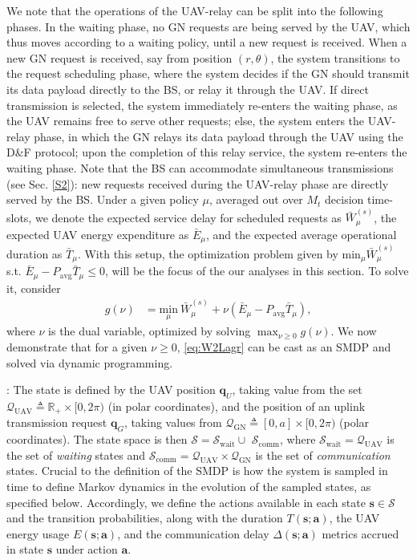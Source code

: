 \documentclass[12pt, draftcls, onecolumn]{IEEEtran}
\theoremstyle{plain}
\theoremstyle{definition}
\theoremstyle{remark}
\begin{document}
We note that the operations of the UAV-relay can be split into the following phases. In the waiting phase, no GN requests are being served by the UAV, which thus moves according to a waiting policy, until a new request is received. When a new GN request is received, say from position $(r,\theta)$, the system transitions to the request scheduling phase, where the system decides if the GN should transmit its data payload directly to the BS, or relay it through the UAV. If direct transmission is selected, the system immediately re-enters the waiting phase, as the UAV remains free to serve other requests; else, the system enters the UAV-relay phase, in which the GN relays its data payload through the UAV using the D\&F protocol; upon the completion of this relay service, the system re-enters the waiting phase. Note that the BS can accommodate simultaneous transmissions (see Sec. \ref{S2}): new requests received during the UAV-relay phase are directly served by the BS. Under a given policy $\mu$, averaged out over $M_{t}$ decision time-slots, we denote the expected service delay for scheduled requests as $\bar{W}_{\mu}^{(s)}$, the expected UAV energy expenditure as $\bar{E}_{\mu}$, and the expected average operational duration as $\bar{T}_{\mu}$. With this setup, the optimization problem given by ${\mathrm{min}}_{\mu}\bar{W}_{\mu}^{(s)}$ s.t. $\bar{E}_{\mu}{-}P_{\mathrm{avg}}\bar{T}_{\mu}{\leq}0$, will be the focus of the our analyses in this section. To solve it, consider
\begin{align}\label{eq:W2Lagr}
    g(\nu)&{=}\underset{\mu}{\mathrm{min}}\ \bar{W}_{\mu}^{(s)} + \nu (\bar{E}_{\mu}-P_{\mathrm{avg}}\bar{T}_{\mu}),
\end{align}
where $\nu$ is the dual variable, optimized by solving $\max_{\nu{\geq}0}g(\nu)$. We now demonstrate that for a given $\nu{\geq}0$, \eqref{eq:W2Lagr} can be cast as an SMDP and solved via dynamic programming.

: The state is defined by the UAV position $\mathbf{q}_{U}$, taking value from the set $\mathcal{Q}_{\mathrm{UAV}}\triangleq\mathbb{R}_{+}\times[0,2\pi)$ (in polar coordinates), and the position of an uplink transmission request $\mathbf{q}_G$, taking values from $\mathcal{Q}_{\mathrm{GN}}{\triangleq}[0,a]{\times}[0,2\pi)$ (polar coordinates). The state space is then $\mathcal{S}{=}\mathcal{S}_{\mathrm{wait}}{\cup}$ $\mathcal{S}_{\mathrm{comm}}$, where $\mathcal{S}_{\mathrm{wait}}{=}\mathcal{Q}_{\mathrm{UAV}}$ is the set of \emph{waiting} states and $\mathcal{S}_{\mathrm{comm}}{=}\mathcal{Q}_{\mathrm{UAV}}{\times}\mathcal{Q}_{\mathrm{GN}}$ is the set of \emph{communication} states. Crucial to the definition of the SMDP is how the system is sampled in time to define Markov dynamics in the evolution of the sampled states, as specified below. Accordingly, we define the actions available in each state $\mathbf{s}{\in}\mathcal{S}$ and the transition probabilities, along with the duration $T(\mathbf{s};\mathbf{a})$, the UAV energy usage $E(\mathbf{s};\mathbf{a})$, and the communication delay $\Delta(\mathbf{s};\mathbf{a})$ metrics accrued in state $\mathbf{s}$ under action $\mathbf{a}$.
\end{document}
